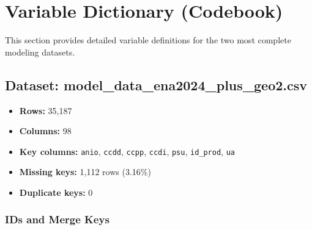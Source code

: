 \documentclass[11pt,a4paper]{article}
\begin{document}
\newpage
\section{Variable Dictionary (Codebook)}
\label{sec:codebook}

This section provides detailed variable definitions for the two most complete modeling datasets.

\subsection{Dataset: model\_data\_ena2024\_plus\_geo2.csv}

\begin{itemize}[leftmargin=1.5em]
    \item \textbf{Rows:} 35,187
    \item \textbf{Columns:} 98
    \item \textbf{Key columns:} \texttt{anio}, \texttt{ccdd}, \texttt{ccpp}, \texttt{ccdi}, \texttt{psu}, \texttt{id\_prod}, \texttt{ua}
    \item \textbf{Missing keys:} 1,112 rows (3.16\%)
    \item \textbf{Duplicate keys:} 0
\end{itemize}

\subsubsection{IDs and Merge Keys}
\end{document}
